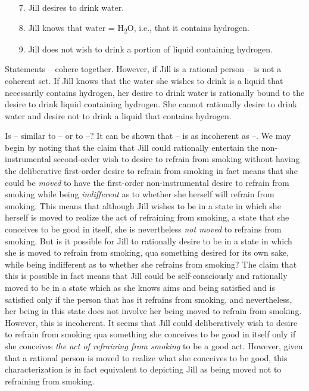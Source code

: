 \documentclass[output=paper,colorlinks,citecolor=brown
]{langscibook}
\begin{document}
\begin{itemize}
\item[7.]\label{item-jill-seven}	Jill desires to drink water.

\item[8.]\label{item-jill8}	Jill knows that water = H\textsubscript{2}O, i.e., that it contains hydrogen.

\item[9.]\label{item-jill-nine}	Jill does not wish to drink a portion of liquid containing hydrogen.
\end{itemize}

Statements -- cohere together. However, if Jill is a rational person -- is not a coherent set. If Jill knows that the water she wishes to drink is a liquid that necessarily contains hydrogen, her desire to drink water is rationally bound to the desire to drink liquid containing hydrogen. She cannot rationally desire to drink water and desire not to drink a liquid that contains hydrogen. 

Is -- similar to -- or to --? It can be shown that -- is as incoherent as --.
We may begin by noting that the claim that Jill could rationally entertain the non-instrumental second-order wish to desire to refrain from smoking without having the deliberative first-order desire to refrain from smoking in fact means that she could be \textit{moved} to have the first-order non-instrumental desire to refrain from smoking while being \textit{indifferent} as to whether she herself will refrain from smoking. This means that although Jill wishes to be in a state in which she herself is moved to realize the act of refraining from smoking, a state that she conceives to be good in itself, she is nevertheless \textit{not moved} to refrains from smoking. But is it possible for Jill to rationally desire to be in a state in which she is moved to refrain from smoking, qua something desired for its own sake, while being indifferent as to whether she refrains from smoking? The claim that this is possible in fact means that Jill could be self-consciously and rationally moved to be in a state which as she knows aims and being satisfied and is satisfied only if the person that has it refrains from smoking, and nevertheless, her being in this state does not involve her being moved to refrain from smoking. However, this is incoherent. It seems that Jill could deliberatively wish to desire to refrain from smoking qua something she conceives to be good in itself only if she conceives \textit{the act of refraining from smoking} to be a good act. However, given that a rational person is moved to realize what she conceives to be good, this characterization is in fact equivalent to depicting Jill as being moved not to refraining from smoking.
\end{document}
